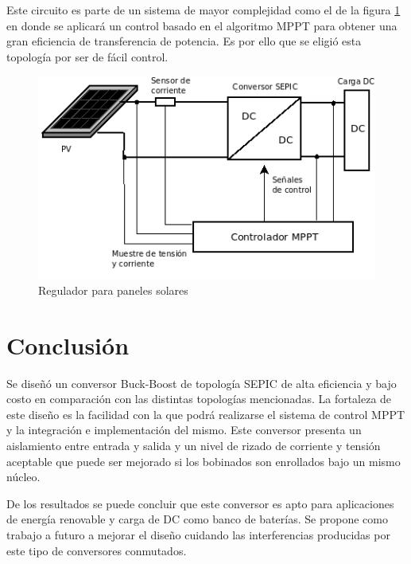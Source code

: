    Este circuito es parte de un sistema de mayor complejidad como el de la figura \ref{fig: PVControl} en donde se aplicará un control basado en el algoritmo MPPT para obtener una gran eficiencia de transferencia de potencia. Es por ello que se eligió esta topología por ser de fácil control. 
   
    \begin{figure}[htbp]
            \centering
             \includegraphics[scale = 0.35]{Figuras/Diagrama1.png}
            \caption{ Regulador para paneles solares}
            \label{fig: PVControl}
      \end{figure}

    
 
    

\section{Conclusión}


    Se diseñó un conversor Buck-Boost de topología SEPIC de alta eficiencia y bajo costo en comparación con las distintas topologías mencionadas. La fortaleza de este diseño es la facilidad con la que podrá realizarse el sistema de control MPPT y la integración e implementación del mismo. 
    Este conversor presenta un aislamiento entre entrada y salida y un nivel de rizado de corriente  y tensión aceptable que puede ser mejorado si los bobinados son enrollados bajo un mismo núcleo. 

    De los resultados se puede concluir que este conversor es apto para aplicaciones de energía renovable y carga de DC como banco de baterías.  Se propone como trabajo a futuro a mejorar el diseño cuidando las interferencias producidas por este tipo de conversores conmutados. 

\nocite{*}



